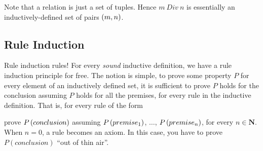 \documentclass[a4paper,12pt]{article}
\newcommand{\term}[1]{\textsf{#1}}
\newcommand{\appl}[2]{#1\inparens{#2}}
\begin{document}
\noindent
Note that a relation is just a set of tuples.  Hence $m\ Div\ n$ is essentially an
inductively-defined set of pairs $\left(m, n\right)$.







\subsection{Rule Induction}

Rule induction rules!  For every \emph{sound} inductive definition, we have a
\term{rule induction} principle for free.  The notion is simple, to prove some
property $P$ for every element of an inductively defined set, it is sufficient to
prove $P$ holds for the conclusion assuming $P$ holds for all the premises, for
every rule in the inductive definition.  That is, for every rule of the form


\noindent
prove $\appl{P}{conclusion}$ assuming $\appl{P}{premise_1}$, $\ldots$,
$\appl{P}{premise_n}$, for every $n \in \mathbf{N}$.  When $n = 0$, a rule becomes
an axiom.  In this case, you have to prove $P(conclusion)$ ``out of thin air''.
\end{document}

